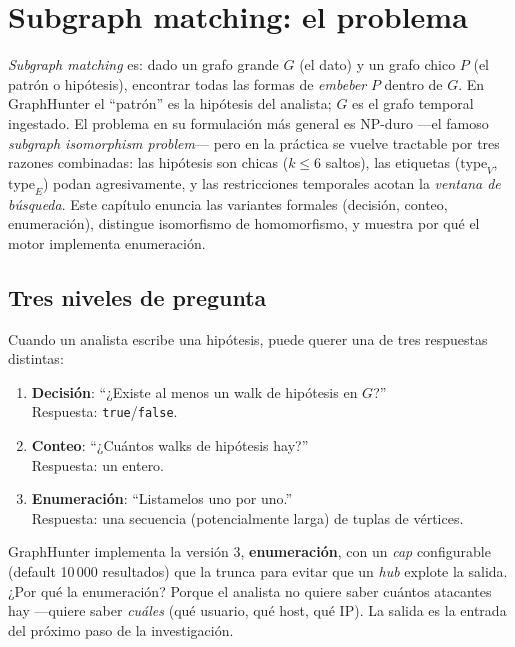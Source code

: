 \chapter{Subgraph matching: el problema}
\label{cap:subgraph-matching}

\begin{intuicion}
\emph{Subgraph matching} es: dado un grafo grande \(G\) (el dato)
y un grafo chico \(P\) (el patrón o hipótesis), encontrar todas las
formas de \emph{embeber} \(P\) dentro de \(G\). En GraphHunter el
``patrón'' es la hipótesis del analista; \(G\) es el grafo temporal
ingestado. El problema en su formulación más general es NP-duro
---el famoso \emph{subgraph isomorphism problem}--- pero en la
práctica se vuelve tractable por tres razones combinadas: las
hipótesis son chicas (\(k \leq 6\) saltos), las etiquetas
(\(\mathrm{type}_V\), \(\mathrm{type}_E\)) podan agresivamente, y
las restricciones temporales acotan la \emph{ventana de búsqueda}.
Este capítulo enuncia las variantes formales (decisión, conteo,
enumeración), distingue isomorfismo de homomorfismo, y muestra por
qué el motor implementa enumeración.
\end{intuicion}

\section{Tres niveles de pregunta}

Cuando un analista escribe una hipótesis, puede querer una de tres
respuestas distintas:

\begin{enumerate}
    \item \textbf{Decisión}: ``¿Existe al menos un walk de hipótesis
    en \(G\)?'' \\
    Respuesta: \texttt{true}/\texttt{false}.
    \item \textbf{Conteo}: ``¿Cuántos walks de hipótesis hay?'' \\
    Respuesta: un entero.
    \item \textbf{Enumeración}: ``Listamelos uno por uno.'' \\
    Respuesta: una secuencia (potencialmente larga) de tuplas de
    vértices.
\end{enumerate}

GraphHunter implementa la versión 3, \textbf{enumeración}, con un
\emph{cap} configurable (default 10\,000 resultados) que la trunca
para evitar que un \emph{hub} explote la salida. ¿Por qué la
enumeración? Porque el analista no quiere saber cuántos atacantes
hay ---quiere saber \emph{cuáles} (qué usuario, qué host, qué IP).
La salida es la entrada del próximo paso de la investigación.

